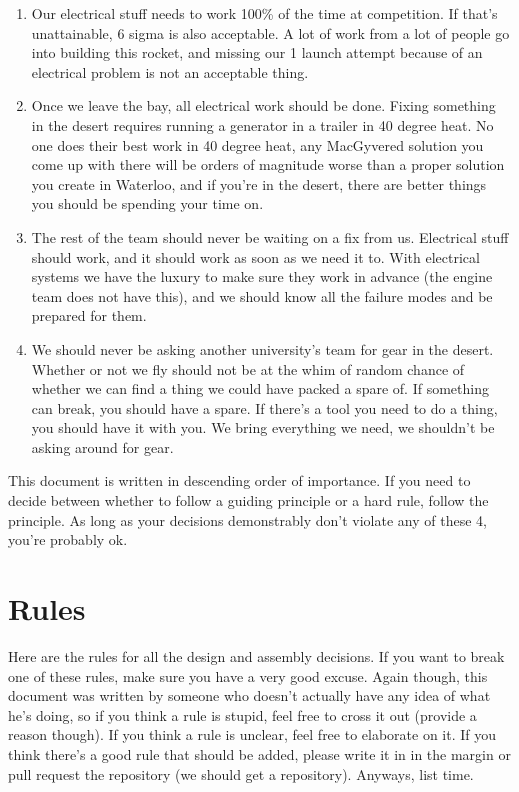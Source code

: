 \documentclass{article}
\begin{document}
\begin{enumerate}
\item Our electrical stuff needs to work 100\% of the time at competition. If that's unattainable, 6 sigma is also acceptable. A lot of work from a lot of people go into building this rocket, and missing our 1 launch attempt because of an electrical problem is not an acceptable thing.
\item Once we leave the bay, all electrical work should be done. Fixing something in the desert requires running a generator in a trailer in 40 degree heat. No one does their best work in 40 degree heat, any MacGyvered solution you come up with there will be orders of magnitude worse than a proper solution you create in Waterloo, and if you're in the desert, there are better things you should be spending your time on.
\item The rest of the team should never be waiting on a fix from us. Electrical stuff should work, and it should work as soon as we need it to. With electrical systems we have the luxury to make sure they work in advance (the engine team does not have this), and we should know all the failure modes and be prepared for them. 
\item We should never be asking another university's team for gear in the desert. Whether or not we fly should not be at the whim of random chance of whether we can find a thing we could have packed a spare of. If something can break, you should have a spare. If there's a tool you need to do a thing, you should have it with you. We bring everything we need, we shouldn't be asking around for gear.
\end{enumerate}
This document is written in descending order of importance. If you need to decide between whether to follow a guiding principle or a hard rule, follow the principle. As long as your decisions demonstrably don't violate any of these 4, you're probably ok.

\section{Rules}
Here are the rules for all the design and assembly decisions. If you want to break one of these rules, make sure you have a very good excuse. Again though, this document was written by someone who doesn't actually have any idea of what he's doing, so if you think a rule is stupid, feel free to cross it out (provide a reason though). If you think a rule is unclear, feel free to elaborate on it. If you think there's a good rule that should be added, please write it in in the margin or pull request the repository (we should get a repository). Anyways, list time.
\end{document}
